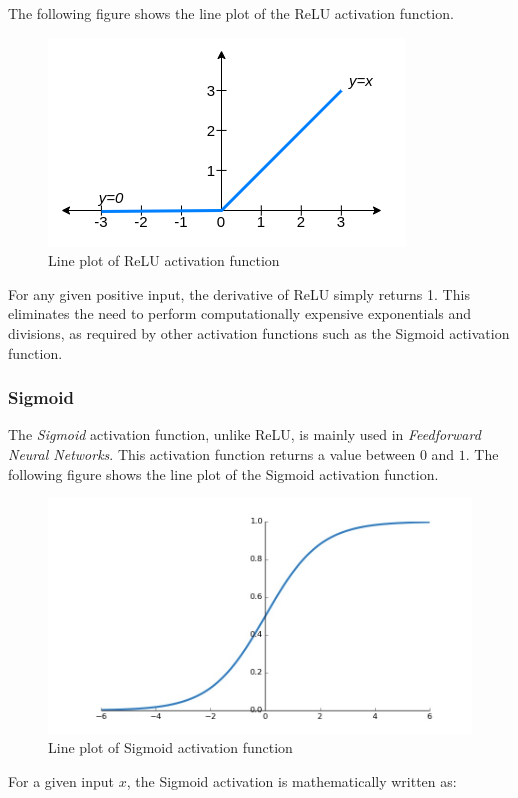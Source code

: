 The following figure shows the line plot of the ReLU activation function.

\begin{figure}[h]
    \centering
    \includegraphics[width=0.5\linewidth]{images/background/relu.png}
    \caption[Rectified Linear Unit]{Line plot of ReLU activation function}
    \label{fig:relu}
\end{figure}

For any given positive input, the derivative of ReLU simply returns 1. This eliminates the need to perform computationally expensive exponentials and divisions, as required by other activation functions such as the Sigmoid activation function.

\subsubsection{Sigmoid}\label{subsubsection:sigmoid}

The \textit{Sigmoid} activation function, unlike ReLU, is mainly used in \textit{Feedforward Neural Networks}. This activation function returns a value between $0$ and $1$. The following figure shows the line plot of the Sigmoid activation function.

\begin{figure}[h]
    \centering
    \includegraphics[width=0.7\linewidth]{images/background/sigmoid.jpg}
    \caption[Sigmoid activation function]{Line plot of Sigmoid activation function \cite{sigmoid}}
    \label{fig:sigmoid}
\end{figure}

For a given input $x$, the Sigmoid activation is mathematically written as:

